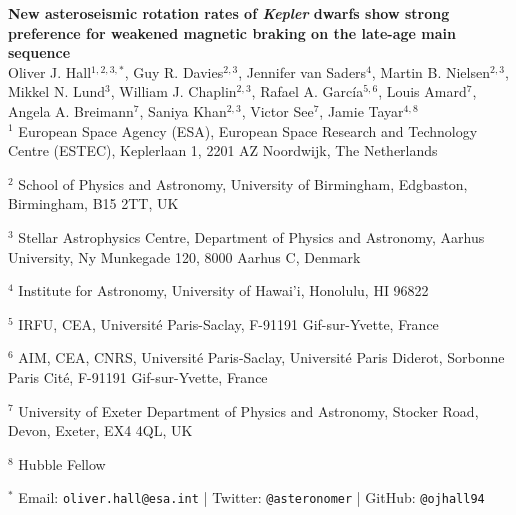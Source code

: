 \documentclass[12pt]{article}
\newcommand{\rtwo}[1]{{#1}}
\renewcommand*{\thefootnote}{\fnsymbol{footnote}}
\begin{document}
\noindent\textbf{\LARGE{New asteroseismic rotation rates of \emph{Kepler} dwarfs show strong \rtwo{preference for} weakened magnetic braking on the late-age main sequence}}\\

\noindent Oliver J. Hall$^{1,2,3,*}$,
	Guy R. Davies$^{2,3}$, 
	Jennifer van Saders$^{4}$,
	Martin B. Nielsen$^{2,3}$,
	Mikkel N. Lund$^{3}$, 
	William J. Chaplin$^{2,3}$, 
	Rafael A. Garc\'ia$^{5, 6}$, 
	Louis Amard$^{7}$,
	Angela A. Breimann$^{7}$, 
	Saniya Khan$^{2,3}$, 
	Victor See$^{7}$, 
	Jamie Tayar$^{4, 8}$
	\\
	
	\noindent $^{1}$ European Space Agency (ESA), European Space Research and Technology Centre (ESTEC), Keplerlaan 1, 2201 AZ Noordwijk, The Netherlands

	\noindent 	$^{2}$ School of Physics and Astronomy, University of Birmingham, Edgbaston, Birmingham, B15 2TT, UK

	\noindent 	$^{3}$ Stellar Astrophysics Centre, Department of Physics and Astronomy, Aarhus University, Ny Munkegade 120, 8000 Aarhus C, Denmark

	\noindent 	$^{4}$ Institute for Astronomy, University of Hawai'i, Honolulu, HI 96822

	\noindent 	$^{5}$ IRFU, CEA, Universit\'e Paris-Saclay, F-91191 Gif-sur-Yvette, France

	\noindent 	$^{6}$ AIM, CEA, CNRS, Universit\'e Paris-Saclay, Universit\'e Paris Diderot, Sorbonne Paris Cit\'e, F-91191 Gif-sur-Yvette, France

	\noindent 	$^{7}$ University of Exeter Department of Physics and Astronomy, Stocker Road, Devon, Exeter, EX4 4QL, UK
	
	\noindent $^{8}$ Hubble Fellow
	
	\noindent $^{*}$ Email: \texttt{oliver.hall@esa.int} | Twitter: \texttt{@asteronomer} | GitHub: \texttt{@ojhall94}


\vspace{10mm}

\renewcommand*{\thefootnote}{\arabic{footnote}}
\setcounter{footnote}{0}
\end{document}
